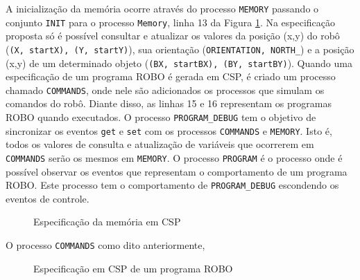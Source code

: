 A inicialização da memória ocorre através do processo \texttt{MEMORY} passando o conjunto \texttt{INIT} para o processo \texttt{Memory}, linha 13 da Figura \ref{fig:model}. Na especificação proposta só é possível consultar e atualizar os valores da posição (x,y) do robô (\texttt{(X, startX), (Y, startY)}), sua orientação (\texttt{ORIENTATION, NORTH\_}) e a posição (x,y) de um determinado objeto (\texttt{(BX, startBX), (BY, startBY)}). Quando uma especificação de um programa ROBO é gerada em CSP, é criado um processo chamado \texttt{COMMANDS}, onde nele são adicionados os processos que simulam os comandos do robô. Diante disso, as linhas 15 e 16 representam os programas ROBO quando executados. O processo \texttt{PROGRAM\_DEBUG} tem o objetivo de sincronizar os eventos \texttt{get} e \texttt{set} com os processos \texttt{COMMANDS} e \texttt{MEMORY}. Isto é, todos os valores de consulta e atualização de variáveis que ocorrerem em \texttt{COMMANDS} serão os mesmos em \texttt{MEMORY}. O processo \texttt{PROGRAM} é o processo onde é possível observar os eventos que representam o comportamento de um programa ROBO. Este processo tem o comportamento de \texttt{PROGRAM\_DEBUG} escondendo os eventos de controle.

\begin{figure}[h]
\caption{Especificação da memória em CSP}

\label{fig:model}
\end{figure}

O processo \texttt{COMMANDS} como dito anteriormente, 

\begin{figure}[h]
\caption{Especificação em CSP de um programa ROBO}

\label{fig:programcsp}
\end{figure}

